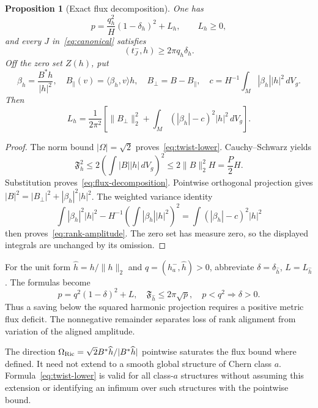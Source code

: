 \documentclass[11pt]{article}
\newcommand{\dd}{\,dV_g}
\newtheorem{proposition}[theorem]{Proposition}
\theoremstyle{definition}
\theoremstyle{remark}
\begin{document}
\begin{proposition}[Exact flux decomposition]
\label{prop:flux}
One has
\begin{equation}
 \boxed{p=\frac{q_h^2}{H}(1-\delta_h)^2+L_h,\qquad L_h\ge0,}
 \label{eq:flux-decomposition}
\end{equation}
and every $J$ in~\eqref{eq:canonical} satisfies
\begin{equation}
 (t_J^-,h)\ge2\pi q_h\delta_h.
 \label{eq:twist-lower}
\end{equation}
Off the zero set $Z(h)$, put
\[
 \beta_h=\frac{B^*h}{|h|^2},\quad
 B_\parallel(v)=\langle\beta_h,v\rangle h,\quad
 B_\perp=B-B_\parallel,\quad
 c=H^{-1}\int_M|\beta_h||h|^2\dd.
\]
Then
\begin{equation}
 \boxed{L_h=\frac1{2\pi^2}\left[
 \|B_\perp\|_2^2+
 \int_M(|\beta_h|-c)^2|h|^2\dd\right].}
 \label{eq:rank-amplitude}
\end{equation}
\end{proposition}
\begin{proof}
The norm bound $|\Omega|=\sqrt2$ proves~\eqref{eq:twist-lower}.
Cauchy--Schwarz yields
\[
 \mathfrak F_h^2
 \le2\left(\int|B||h|\dd\right)^2
 \le2\|B\|_2^2H=\frac P2H.
\]
Substitution proves~\eqref{eq:flux-decomposition}.
Pointwise orthogonal projection gives
$|B|^2=|B_\perp|^2+|\beta_h|^2|h|^2$.
The weighted variance identity
\[
 \int|\beta_h|^2|h|^2-
 H^{-1}\left(\int|\beta_h||h|^2\right)^2
 =\int(|\beta_h|-c)^2|h|^2
\]
then proves~\eqref{eq:rank-amplitude}. The zero set has measure zero,
so the displayed integrals are unchanged by its omission.
\end{proof}

For the unit form $\widehat h=h/\|h\|_2$ and
$q=(h_a^-,\widehat h)>0$, abbreviate $\delta=\delta_{\widehat h}$,
$L=L_{\widehat h}$. The formulas become
\begin{equation}
 p=q^2(1-\delta)^2+L,\quad
 \mathfrak F_{\widehat h}\le2\pi\sqrt p,\quad
 p<q^2\Longrightarrow\delta>0.
 \label{eq:unit-flux}
\end{equation}
Thus a saving below the squared harmonic projection requires a positive
metric flux deficit. The nonnegative remainder separates loss of rank
alignment from variation of the aligned amplitude.

The direction
$\Omega_{\rm Ric}=\sqrt2 B^*\widehat h/|B^*\widehat h|$
pointwise saturates the flux bound where defined. It need not extend to
a smooth global structure of Chern class $a$. Formula~\eqref{eq:twist-lower}
is valid for all class-$a$ structures without assuming this extension or
identifying an infimum over such structures with the pointwise bound.
\end{document}
